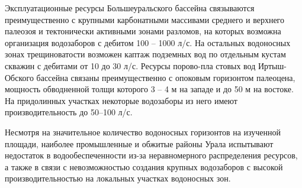 \documentclass[a4paper,12pt]{article} %
\begin{document}
Эксплуатационные ресурсы Большеуральского бассейна связываются преимущественно с крупными карбонатными массивами среднего и верхнего палеозоя и тектонически активными зонами разломов, на которых возможна организация водозаборов с дебитом 100 – 1000 л/с. На остальных водоносных зонах трещиноватости возможен каптаж подземных вод по отдельным кустам скважин с дебитами от 10 до 30 л/с. Ресурсы порово-пла
стовых вод Иртыш-Обского бассейна связаны преимущественно с опоковым горизонтом палеоцена, мощность обводненной толщи которого 3 – 4 м на западе и до 50 м на востоке. На придолинных участках некоторые водозаборы из него имеют производительность до 50–100 л/с.

Несмотря на значительное количество водоносных горизонтов на изученной площади, наиболее промышленные и обжитые районы Урала испытывают недостаток в водообеспеченности из-за неравномерного распределения ресурсов, а также в связи с невозможностью создания крупных водозаборов с высокой производительностью на локальных участках водоносных зон.
\end{document}
